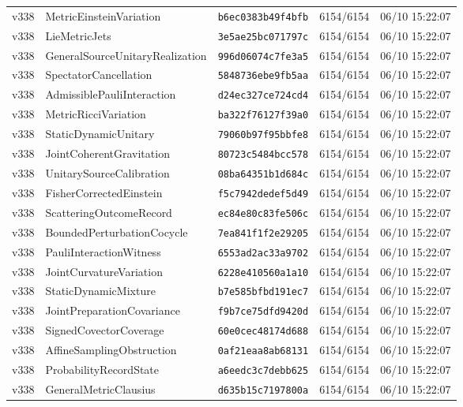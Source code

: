 \documentclass[11pt]{article}
\theoremstyle{definition}\newtheorem{deriv}{Derivação}
\begin{document}
{\begin{longtable}{@{}lllll@{}}
v338 & MetricEinsteinVariation & \texttt{b6ec0383b49f4bfb} & 6154/6154 & 06/10 15:22:07 \\
v338 & LieMetricJets & \texttt{3e5ae25bc071797c} & 6154/6154 & 06/10 15:22:07 \\
v338 & GeneralSourceUnitaryRealization & \texttt{996d06074c7fe3a5} & 6154/6154 & 06/10 15:22:07 \\
v338 & SpectatorCancellation & \texttt{5848736ebe9fb5aa} & 6154/6154 & 06/10 15:22:07 \\
v338 & AdmissiblePauliInteraction & \texttt{d24ec327ce724cd4} & 6154/6154 & 06/10 15:22:07 \\
v338 & MetricRicciVariation & \texttt{ba322f76127f39a0} & 6154/6154 & 06/10 15:22:07 \\
v338 & StaticDynamicUnitary & \texttt{79060b97f95bbfe8} & 6154/6154 & 06/10 15:22:07 \\
v338 & JointCoherentGravitation & \texttt{80723c5484bcc578} & 6154/6154 & 06/10 15:22:07 \\
v338 & UnitarySourceCalibration & \texttt{08ba64351b1d684c} & 6154/6154 & 06/10 15:22:07 \\
v338 & FisherCorrectedEinstein & \texttt{f5c7942dedef5d49} & 6154/6154 & 06/10 15:22:07 \\
v338 & ScatteringOutcomeRecord & \texttt{ec84e80c83fe506c} & 6154/6154 & 06/10 15:22:07 \\
v338 & BoundedPerturbationCocycle & \texttt{7ea841f1f2e29205} & 6154/6154 & 06/10 15:22:07 \\
v338 & PauliInteractionWitness & \texttt{6553ad2ac33a9702} & 6154/6154 & 06/10 15:22:07 \\
v338 & JointCurvatureVariation & \texttt{6228e410560a1a10} & 6154/6154 & 06/10 15:22:07 \\
v338 & StaticDynamicMixture & \texttt{b7e585bfbd191ec7} & 6154/6154 & 06/10 15:22:07 \\
v338 & JointPreparationCovariance & \texttt{f9b7ce75dfd9420d} & 6154/6154 & 06/10 15:22:07 \\
v338 & SignedCovectorCoverage & \texttt{60e0cec48174d688} & 6154/6154 & 06/10 15:22:07 \\
v338 & AffineSamplingObstruction & \texttt{0af21eaa8ab68131} & 6154/6154 & 06/10 15:22:07 \\
v338 & ProbabilityRecordState & \texttt{a6eedc3c7debb625} & 6154/6154 & 06/10 15:22:07 \\
v338 & GeneralMetricClausius & \texttt{d635b15c7197800a} & 6154/6154 & 06/10 15:22:07 \\

\end{longtable}}
\end{document}
